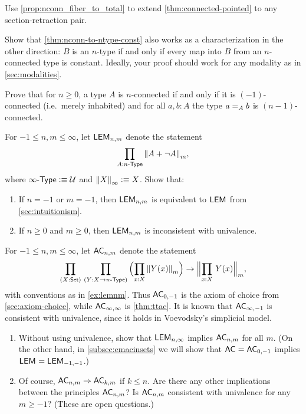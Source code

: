 \begin{ex}
  Use \autoref{prop:nconn_fiber_to_total} to extend \autoref{thm:connected-pointed} to any section-retraction pair.
\end{ex}

\begin{ex}\label{ex:ntype-from-nconn-const}
  Show that \autoref{thm:nconn-to-ntype-const} also works as a characterization in the other direction: $B$ is an $n$-type if and only if every map into $B$ from an $n$-con\-nect\-ed type is constant.
  Ideally, your proof should work for any modality as in \autoref{sec:modalities}.
\end{ex}

\begin{ex}\label{ex:connectivity-inductively}
  Prove that for $n\ge 0$, a type $A$ is $n$-connected if and only if it is $(-1)$-connected (i.e.\ merely inhabited) and for all $a,b:A$ the type $\id[A]ab$ is $(n-1)$-connected.
\end{ex}

\begin{ex}\label{ex:lemnm}
  For $-1\le n,m \le\infty$, let $\LEM{n,m}$ denote the statement
  \[ \prd{A:\ntype{n}} \trunc m{A + \neg A},\]
  where $\ntype{\infty} \defeq \type$ and $\trunc{\infty}{X}\defeq X$.
  Show that:
  \begin{enumerate}
  \item If $n=-1$ or $m=-1$, then $\LEM{n,m}$ is equivalent to $\LEM{}$ from \autoref{sec:intuitionism}.
  \item If $n\ge 0$ and $m\ge 0$, then $\LEM{n,m}$ is inconsistent with univalence.
  \end{enumerate}
\end{ex}

\begin{ex}\label{ex:acnm}
  For $-1\le n,m\le\infty$, let $\choice{n,m}$ denote the statement
  \[ \prd{X:\set}{Y:X\to\ntype{n}}
  \Parens{\prd{x:X} \trunc m{Y(x)}}
  \to
  \Trunc m{\prd{x:X} Y(x)},
  \]
  with conventions as in \autoref{ex:lemnm}.
  Thus $\choice{0,-1}$ is the axiom of choice from \autoref{sec:axiom-choice}, while $\choice{\infty,\infty}$ is \autoref{thm:ttac}.
  It is known that $\choice{\infty,-1}$ is consistent with univalence, since it holds in Voevodsky's simplicial model.
  \begin{enumerate}
  \item Without using univalence, show that $\LEM{n,\infty}$ implies $\choice{n,m}$ for all $m$.
    (On the other hand, in \autoref{subsec:emacinsets} we will show that $\choice{}=\choice{0,-1}$ implies $\LEM{}=\LEM{-1,-1}$.)
  \item Of course, $\choice{n,m}\Rightarrow \choice{k,m}$ if $k\le n$.
    Are there any other implications between the principles $\choice{n,m}$?
    Is $\choice{n,m}$ consistent with univalence for any $m\ge -1$?
    (These are open questions.)
  \end{enumerate}
\end{ex}

